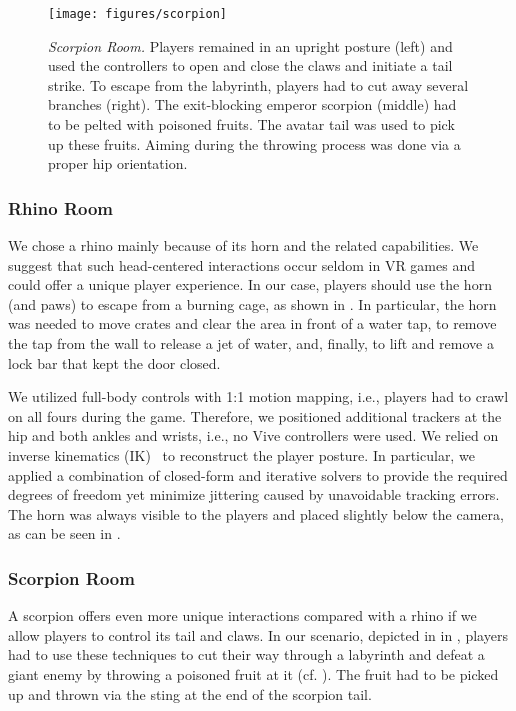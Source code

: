 \documentclass{sigchi}
\begin{document}
\begin{figure*}[t!]
\centering
\texttt{[image: figures/scorpion]}
\caption{
\textit{Scorpion Room.} Players remained in an upright posture (left) and used the controllers to open and close the claws and initiate a tail strike. To escape from the labyrinth, players had to cut away several branches (right). The exit-blocking emperor scorpion (middle) had to be pelted with poisoned fruits. The avatar tail was used to pick up these fruits. Aiming during the throwing process was done via a proper hip orientation.}
\label{fig:scorpion}
\end{figure*}



\subsubsection{Rhino Room}
We chose a rhino mainly because of its horn and the related capabilities. We suggest that such head-centered interactions occur seldom in VR games and could offer a unique player experience. In our case, players should use the horn (and paws) to escape from a burning cage, as shown in . In particular, the horn was needed to move crates and clear the area in front of a water tap, to remove the tap from the wall to release a jet of water, and, finally, to lift and remove a lock bar that kept the door closed.

We utilized full-body controls with 1:1 motion mapping, i.e., players had to crawl on all fours during the game. Therefore, we positioned additional trackers at the hip and both ankles and wrists, i.e., no Vive controllers were used. We relied on inverse kinematics (IK)~\cite{buss2004introduction} to reconstruct the player posture. In particular, we applied a combination of closed-form and iterative solvers to provide the required degrees of freedom yet minimize jittering caused by unavoidable tracking errors. The horn was always visible to the players and placed slightly below the camera, as can be seen in .


\subsubsection{Scorpion Room}
A scorpion offers even more unique interactions compared with a rhino if we allow players to control its tail and claws. In our scenario, depicted in in , players had to use these techniques to cut their way through a labyrinth and defeat a giant enemy by throwing a poisoned fruit at it (cf. ). The fruit had to be picked up and thrown via the sting at the end of the scorpion tail.
\end{document}
